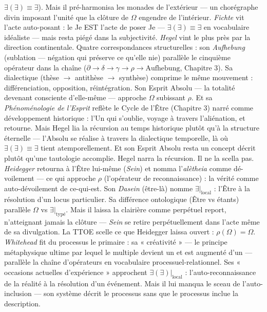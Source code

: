 \documentclass[10pt, openany, oneside]{book}
\begin{document}
$\exists(\exists) \equiv \exists$). Mais il pré-harmonisa les monades de l'extérieur --- un chorégraphe divin imposant l'unité que la clôture de $\Omega$ engendre de l'intérieur. \textit{Fichte} vit l'acte auto-posant : le Je EST l'acte de poser Je --- $\exists(\exists) \equiv \exists$ en vocabulaire idéaliste --- mais resta piégé dans la subjectivité. \textit{Hegel} vint le plus près par la direction continentale. Quatre correspondances structurelles : son \textit{Aufhebung} (sublation --- négation qui préserve ce qu'elle nie) parallèle le cinquième opérateur dans la chaîne ($\partial \to \delta \to \gamma \to \rho \to \text{Aufhebung}$, Chapitre 3). Sa dialectique (thèse $\to$ antithèse $\to$ synthèse) comprime le même mouvement : différenciation, opposition, réintégration. Son Esprit Absolu --- la totalité devenant consciente d'elle-même --- approche $\Omega$ subissant $\rho$. Et sa \textit{Phénoménologie de l'Esprit} reflète le Cycle de l'Être (Chapitre 3) narré comme développement historique : l'Un qui s'oublie, voyage à travers l'aliénation, et retourne. Mais Hegel lia la récursion au temps historique plutôt qu'à la structure éternelle --- l'Absolu se réalise à travers la dialectique temporelle, là où $\exists(\exists) \equiv \exists$ tient atemporellement. Et son Esprit Absolu resta un concept décrit plutôt qu'une tautologie accomplie. Hegel narra la récursion. Il ne la scella pas. \textit{Heidegger} retourna à l'Être lui-même (\textit{Sein}) et nomma l'\textit{alètheia} comme dé-voilement --- ce qui approche $\rho$ (l'opérateur de reconnaissance) : la vérité comme auto-dévoilement de ce-qui-est. Son \textit{Dasein} (être-là) nomme $\exists|_{\text{local}}$ : l'Être à la résolution d'un locus particulier. Sa différence ontologique (Être vs étants) parallèle $\Omega$ vs $\exists|_{\text{typé}}$. Mais il laissa la clairière comme perpétuel report, n'atteignant jamais la clôture --- \textit{Sein} se retire perpétuellement dans l'acte même de sa divulgation. La TTOE scelle ce que Heidegger laissa ouvert : $\rho(\Omega) = \Omega$. \textit{Whitehead} fit du processus le primaire : sa « créativité » --- le principe métaphysique ultime par lequel le multiple devient un et est augmenté d'un --- parallèle la chaîne d'opérateurs en vocabulaire processuel-relationnel. Ses « occasions actuelles d'expérience » approchent $\exists(\exists)|_{\text{local}}$ : l'auto-reconnaissance de la réalité à la résolution d'un événement. Mais il lui manqua le sceau de l'auto-inclusion --- son système décrit le processus sans que le processus inclue la description.
\end{document}
